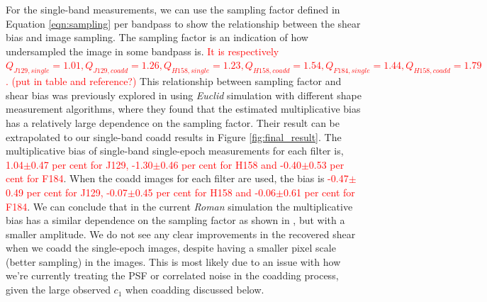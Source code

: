 \documentclass[fleqn,usenatbib]{mnras}
\begin{document}
For the single-band measurements, we can use the sampling factor defined in Equation \ref{eqn:sampling} per bandpass to show the relationship between the shear bias and image sampling. The sampling factor is an indication of how undersampled the image in some bandpass is. \textcolor{red}{It is respectively $Q_{J129,single}=1.01, Q_{J129,coadd}=1.26, Q_{H158,single}=1.23, Q_{H158,coadd}=1.54, Q_{F184,single}=1.44, Q_{H158,coadd}=1.79$. (put in table and reference?)} This relationship between sampling factor and shear bias was previously explored in \citealt{2021MNRAS.502.4048K} using \emph{Euclid} simulation with different shape measurement algorithms, where they found that the estimated multiplicative bias has a relatively large dependence on the sampling factor. Their result can be extrapolated to our single-band coadd results in Figure \ref{fig:final_result}. The multiplicative bias of single-band single-epoch measurements for each filter is, \textcolor{red}{1.04$\pm$0.47 per cent for J129, -1.30$\pm$0.46 per cent for H158 and -0.40$\pm$0.53 per cent for F184}. When the coadd images for each filter are used, the bias is \textcolor{red}{-0.47$\pm$0.49 per cent for J129, -0.07$\pm$0.45 per cent for H158 and -0.06$\pm$0.61 per cent for F184}. We can conclude that in the current \emph{Roman} simulation the multiplicative bias has a similar dependence on the sampling factor as shown in \citealt{2021MNRAS.502.4048K}, but with a smaller amplitude. We do not see any clear improvements in the recovered shear when we coadd the single-epoch images, despite having a smaller pixel scale (better sampling) in the images. This is most likely due to an issue with how we're currently treating the PSF or correlated noise in the coadding process, given the large observed $c_1$ when coadding discussed below. 
\end{document}
